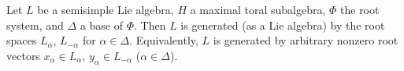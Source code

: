 Let $L$ be a semisimple Lie algebra, $H$ a maximal toral subalgebra, $\Phi$ the root system, and $\Delta$ a base of $\Phi$. Then $L$ is generated (as a Lie algebra) by the root spaces $L_\alpha$, $L_{-\alpha}$ for $\alpha \in \Delta$. Equivalently, $L$ is generated by arbitrary nonzero root vectors $x_\alpha \in L_\alpha$, $y_\alpha \in L_{-\alpha}$ ($\alpha \in \Delta$).
